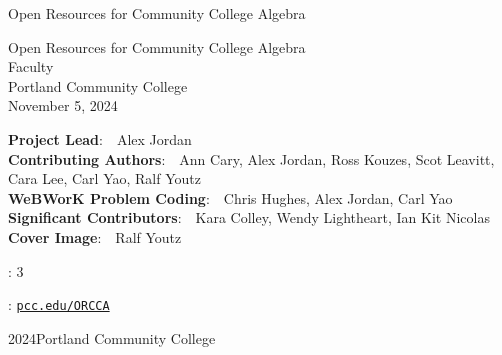 \documentclass[twoside,10pt,]{book}
\newcommand{\titlepagefont}{\relax}
\numberwithin{equation}{section}
\begin{document}
\raggedbottom
\frontmatter
\thispagestyle{empty}
{\titlepagefont\centering
\vspace*{0.28\textheight}
{\Huge Open Resources for Community College Algebra}\\}
\clearpage
\thispagestyle{empty}
\null%
\clearpage
\thispagestyle{empty}
{\titlepagefont\centering
\vspace*{0.14\textheight}
{\Huge Open Resources for Community College Algebra}\\[3\baselineskip]
{\Large Faculty}\\[0.5\baselineskip]
{\Large Portland Community College}\\[3\baselineskip]
{\Large November 5, 2024}\\}
\clearpage
\thispagestyle{empty}
\hypertarget{frontmatter-2}{}
\par\noindent
\textbf{Project Lead}:\ \ Alex Jordan\\
\textbf{Contributing Authors}:\ \ Ann Cary, Alex Jordan, Ross Kouzes, Scot Leavitt, Cara Lee, Carl Yao, Ralf Youtz\\
\textbf{WeBWorK Problem Coding}:\ \ Chris Hughes, Alex Jordan, Carl Yao\\
\textbf{Significant Contributors}:\ \ Kara Colley, Wendy Lightheart, Ian Kit Nicolas\\
\textbf{Cover Image}:\ \ Ralf Youtz
\par{}
: 3\par\medskip
{}: \href{https://www.pcc.edu/ORCCA}{\nolinkurl{pcc.edu/ORCCA}}\par\medskip
\noindent\textcopyright{}2024\quad{}Portland Community College\\[0.5\baselineskip]
\end{document}
